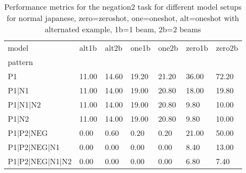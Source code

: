 \begin{table}[h]
\begin{tabular}{l|llllll}
\toprule
model & alt1b & alt2b & one1b & one2b & zero1b & zero2b \\
pattern &  &  &  &  &  &  \\
\midrule
P1 & 11.00 & 14.60 & 19.20 & 21.20 & 36.00 & 72.20 \\
P1|N1 & 11.00 & 14.00 & 19.00 & 20.80 & 18.00 & 19.80 \\
P1|N1|N2 & 11.00 & 14.00 & 19.00 & 20.80 & 9.80 & 10.00 \\
P1|N2 & 11.00 & 14.00 & 19.00 & 20.80 & 9.80 & 10.00 \\
P1|P2|NEG & 0.00 & 0.60 & 0.20 & 0.20 & 21.00 & 50.00 \\
P1|P2|NEG|N1 & 0.00 & 0.00 & 0.00 & 0.00 & 8.40 & 13.00 \\
P1|P2|NEG|N1|N2 & 0.00 & 0.00 & 0.00 & 0.00 & 6.80 & 7.40 \\
\bottomrule
\end{tabular}
\caption{Performance metrics for the negation2 task for different model setups for normal japanese, zero=zeroshot, one=oneshot, alt=oneshot with alternated example, 1b=1 beam, 2b=2 beams}
\label{tab:ja norm_negation2_performance}
\end{table}
